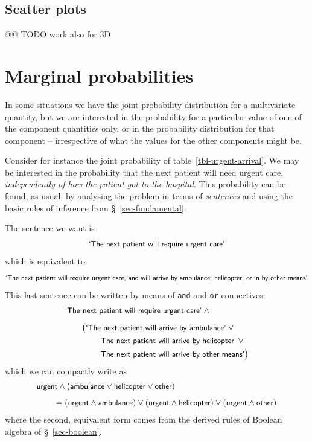 \documentclass[
  a4paper,
  DIV=11,
  numbers=noendperiod,
  oneside]{scrreprt}
\begin{document}
\hypertarget{scatter-plots-1}{%
\subsection{Scatter plots}\label{scatter-plots-1}}

@@ TODO work also for 3D

\hfill\break

\hypertarget{marginal-probabilities}{%
\section{Marginal probabilities}\label{marginal-probabilities}}

In some situations we have the joint probability distribution for a
multivariate quantity, but we are interested in the probability for a
particular value of one of the component quantities only, or in the
probability distribution for that component -- irrespective of what the
values for the other components might be.

Consider for instance the joint probability of
table~\ref{tbl-urgent-arrival}. We may be interested in the probability
that the next patient will need urgent care, \emph{independently of how
the patient got to the hospital}. This probability can be found, as
usual, by analysing the problem in terms of \emph{sentences} and using
the basic rules of inference from §~\ref{sec-fundamental}.

The sentence we want is \[
\textsf{\small`The next patient will require urgent care'}
\] which is equivalent to \[
\textsf{\small`The next patient will require urgent care, and will arrive by ambulance, helicopter, or in by other means'}
\] This last sentence can be written by means of \texttt{and} and
\texttt{or} connectives: \[
\begin{aligned}
&\textsf{\small`The next patient will require urgent care'} \land{}
\\[1ex]
&\qquad\bigl(\textsf{\small`The next patient will arrive by ambulance'} \lor {}
\\&\qquad\qquad
\textsf{\small`The next patient will arrive by helicopter'} \lor {}
\\&\qquad\qquad
\textsf{\small`The next patient will arrive by other means'}\bigr)
\end{aligned}
\] which we can compactly write as \[
\begin{aligned}
&\textsf{\small urgent}\land
(\textsf{\small ambulance} \lor \textsf{\small helicopter} \lor \textsf{\small other})
\\[1ex]
&\qquad{}=
(\textsf{\small urgent}\land \textsf{\small ambulance}) \lor
(\textsf{\small urgent}\land \textsf{\small helicopter}) \lor
(\textsf{\small urgent}\land \textsf{\small other})
\end{aligned}
\] where the second, equivalent form comes from the derived rules of
Boolean algebra of §~\ref{sec-boolean}.
\end{document}
